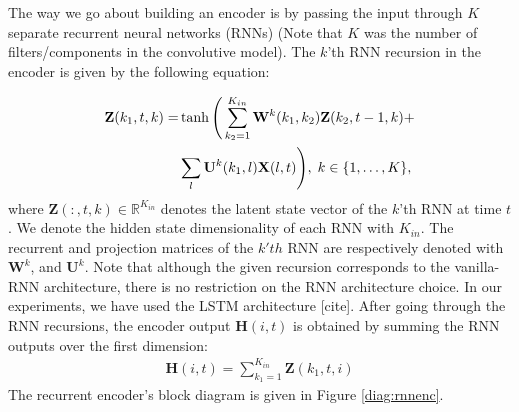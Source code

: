 \documentclass{article}
\begin{document}
The way we go about building an encoder is by passing the input through $K$ separate recurrent neural networks (RNNs) (Note that $K$ was the number of filters/components in the convolutive model). The $k$'th RNN recursion in the encoder is given by the following equation:    

\begin{align}
  \mathbf Z(k_1, t, k) =& \tanh \Bigg( \sum_{k_2 = 1}^{K_{in}} \mathbf W^k(k_1,k_2 ) \mathbf Z(k_2, t-1, k) + \notag \\
  & \hspace{0cm} \sum_l \mathbf U^k(k_1,l) \mathbf X(l, t) \Bigg),\; k \in \{1,\dots,K\}, 
\end{align}
where $\mathbf Z(:, t, k) \in \mathbb R^{K_{in}}$ denotes the latent state vector of the $k$'th RNN at time $t$. We denote the hidden state dimensionality of each RNN with $K_{in}$. The recurrent and projection matrices of the $k'th$ RNN are respectively denoted with $\mathbf W^k$, and $\mathbf U^k$. Note that although the given recursion corresponds to the vanilla-RNN architecture, there is no restriction on the RNN architecture choice. In our experiments, we have used the LSTM architecture [cite]. After going through the RNN recursions, the encoder output $\mathbf H(i, t)$ is obtained by summing the RNN outputs over the first dimension:
\begin{align}
  \mathbf H(i, t) = \sum_{k_1=1}^{K_{in}} \mathbf Z(k_1, t, i)
\end{align}
The recurrent encoder's block diagram is given in Figure \ref{diag:rnnenc}. \\
\end{document}

